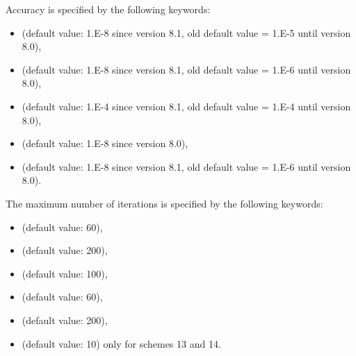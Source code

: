 Accuracy is specified by the following keywords:

\begin{itemize}
\item {} (default value: 1.E-8
  since version 8.1, old default value = 1.E-5 until version 8.0),

\item {} (default value: 1.E-8
  since version 8.1, old default value = 1.E-6 until version 8.0),

\item {} (default value: 1.E-4
  since version 8.1, old default value = 1.E-4 until version 8.0),

%
\item {} (default value: 1.E-8
since version 8.0),

\item {} (default value: 1.E-8
  since version 8.1, old default value = 1.E-6 until version 8.0).
\end{itemize}

The maximum number of iterations is specified by the following keywords:

\begin{itemize}
\item {}(default value: 60),

\item {} (default value:
200),

\item {} (default value: 100),

%
\item {}(default
value: 60),

\item {}(default
value: 200),

\item {}(default
value: 10) only for schemes 13 and 14.
\end{itemize}

